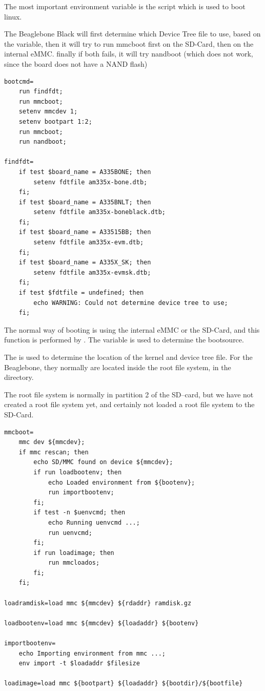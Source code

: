 \clearpage

The most important environment variable is the  script which is used to boot linux.

The Beaglebone Black will first determine which Device Tree file to use, based on the 
variable, then it will try to run mmcboot first on the SD-Card, then on the internal eMMC.
finally if both fails, it will try nandboot (which does not work, since the board does not have a NAND flash)

\begin{lstlisting}
bootcmd=
	run findfdt; 
	run mmcboot;
	setenv mmcdev 1; 
	setenv bootpart 1:2; 
	run mmcboot;
	run nandboot;
		
findfdt=
	if test $board_name = A335BONE; then
		setenv fdtfile am335x-bone.dtb;
	fi;
	if test $board_name = A335BNLT; then
		setenv fdtfile am335x-boneblack.dtb;
	fi;
	if test $board_name = A33515BB; then
		setenv fdtfile am335x-evm.dtb;
	fi;
	if test $board_name = A335X_SK; then
		setenv fdtfile am335x-evmsk.dtb;
	fi;
	if test $fdtfile = undefined; then
		echo WARNING: Could not determine device tree to use;
	fi;
\end{lstlisting}

\clearpage
The normal way of booting is using the internal eMMC or the SD-Card, and
this function is performed by . The  variable
is used to determine the bootsource.

The  is used to determine the location of the kernel and device tree file.
For the Beaglebone, they normally are located inside the root file system, in the  directory.

The root file system is normally in partition 2 of the SD--card, but we have not created
a root file system yet, and certainly not loaded a root file system to the SD-Card.

\begin{lstlisting}
mmcboot=
	mmc dev ${mmcdev};
	if mmc rescan; then
		echo SD/MMC found on device ${mmcdev};
		if run loadbootenv; then
			echo Loaded environment from ${bootenv};
			run importbootenv;
		fi;
		if test -n $uenvcmd; then 
			echo Running uenvcmd ...;
			run uenvcmd;
		fi;
		if run loadimage; then
			run mmcloados;
		fi;
	fi;

loadramdisk=load mmc ${mmcdev} ${rdaddr} ramdisk.gz

loadbootenv=load mmc ${mmcdev} ${loadaddr} ${bootenv}

importbootenv=
	echo Importing environment from mmc ...; 
	env import -t $loadaddr $filesize

loadimage=load mmc ${bootpart} ${loadaddr} ${bootdir}/${bootfile}
\end{lstlisting}


